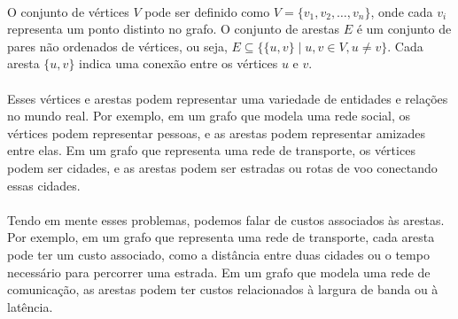 \documentclass[12pt,a4paper]{article}
\begin{document}
\begin{center}
\label{fig:def-grafo}
\end{center}

\paragraph{}
O conjunto de vértices \(V\) pode ser definido como \(V = \{v_1, v_2, \ldots, v_n\}\), onde cada \(v_i\) representa um ponto distinto no grafo. O conjunto de arestas \(E\) é um conjunto de pares não ordenados de vértices, ou seja, \(E \subseteq \{\{u, v\} \mid u, v \in V, u \neq v\}\). Cada aresta \(\{u, v\}\) indica uma conexão entre os vértices \(u\) e \(v\).

\paragraph{}
Esses vértices e arestas podem representar uma variedade de entidades e relações no mundo real. Por exemplo, em um grafo que modela uma rede social, os vértices podem representar pessoas, e as arestas podem representar amizades entre elas. Em um grafo que representa uma rede de transporte, os vértices podem ser cidades, e as arestas podem ser estradas ou rotas de voo conectando essas cidades.

\paragraph{}
Tendo em mente esses problemas, podemos falar de custos associados às arestas. Por exemplo, em um grafo que representa uma rede de transporte, cada aresta pode ter um custo associado, como a distância entre duas cidades ou o tempo necessário para percorrer uma estrada. Em um grafo que modela uma rede de comunicação, as arestas podem ter custos relacionados à largura de banda ou à latência.
\end{document}

